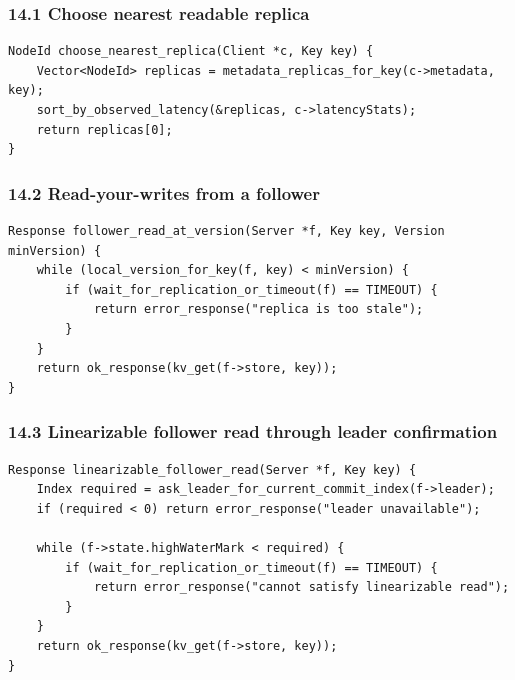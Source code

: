 \documentclass[10pt,letterpaper]{article}
\begin{document}
\subsubsection*{14.1 Choose nearest readable replica}

\begin{verbatim}
NodeId choose_nearest_replica(Client *c, Key key) {
    Vector<NodeId> replicas = metadata_replicas_for_key(c->metadata, key);
    sort_by_observed_latency(&replicas, c->latencyStats);
    return replicas[0];
}
\end{verbatim}

\subsubsection*{14.2 Read-your-writes from a follower}

\begin{verbatim}
Response follower_read_at_version(Server *f, Key key, Version minVersion) {
    while (local_version_for_key(f, key) < minVersion) {
        if (wait_for_replication_or_timeout(f) == TIMEOUT) {
            return error_response("replica is too stale");
        }
    }
    return ok_response(kv_get(f->store, key));
}
\end{verbatim}

\subsubsection*{14.3 Linearizable follower read through leader confirmation}

\begin{verbatim}
Response linearizable_follower_read(Server *f, Key key) {
    Index required = ask_leader_for_current_commit_index(f->leader);
    if (required < 0) return error_response("leader unavailable");

    while (f->state.highWaterMark < required) {
        if (wait_for_replication_or_timeout(f) == TIMEOUT) {
            return error_response("cannot satisfy linearizable read");
        }
    }
    return ok_response(kv_get(f->store, key));
}
\end{verbatim}

\end{document}
